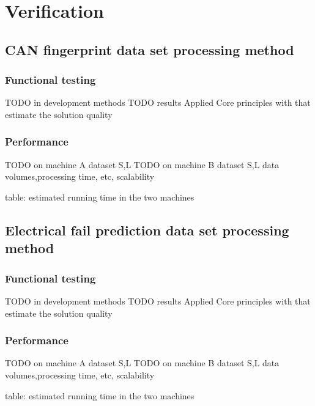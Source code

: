 \chapter{Verification}
\section{CAN fingerprint data set processing method}
\subsection{Functional testing}
TODO in development methods
TODO results
Applied Core principles with that estimate the solution quality
\subsection{Performance}
TODO on machine A dataset S,L
TODO on machine B dataset S,L
	data volumes,processing time, etc, scalability

table: estimated running time in the two machines
\section{Electrical fail prediction data set processing method}
\subsection{Functional testing}
TODO in development methods
TODO results
Applied Core principles with that estimate the solution quality
\subsection{Performance}
TODO on machine A dataset S,L
TODO on machine B dataset S,L
	data volumes,processing time, etc, scalability

table: estimated running time in the two machines